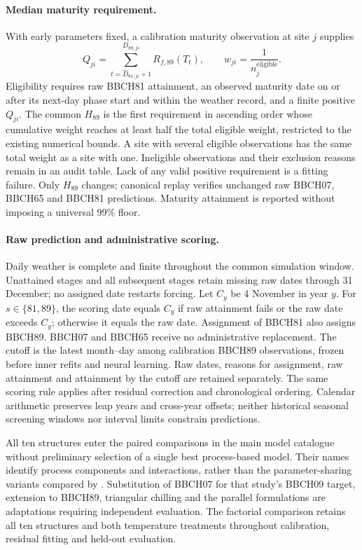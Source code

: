 \documentclass[a4paper,11pt]{article}
\begin{document}
\paragraph{Median maturity requirement.}
With early parameters fixed, a calibration maturity observation at site $j$ supplies
\begin{equation}
Q_{ji}=\sum_{t=\widehat D_{81,ji}+1}^{D_{89,ji}}R_{f,89}(T_t),
\qquad w_{ji}=\frac{1}{n_j^{\mathrm{eligible}}}.
\label{eq:maturity_median_requirement}
\end{equation}
Eligibility requires raw BBCH81 attainment, an observed maturity date on or after its next-day phase start and within the weather record, and a finite positive $Q_{ji}$. The common $H_{89}$ is the first requirement in ascending order whose cumulative weight reaches at least half the total eligible weight, restricted to the existing numerical bounds. A site with several eligible observations has the same total weight as a site with one. Ineligible observations and their exclusion reasons remain in an audit table. Lack of any valid positive requirement is a fitting failure. Only $H_{89}$ changes; canonical replay verifies unchanged raw BBCH07, BBCH65 and BBCH81 predictions. Maturity attainment is reported without imposing a universal 99\% floor.

\paragraph{Raw prediction and administrative scoring.}
Daily weather is complete and finite throughout the common simulation window. Unattained stages and all subsequent stages retain missing raw dates through 31 December; no assigned date restarts forcing. Let $C_y$ be 4 November in year $y$. For $s\in\{81,89\}$, the scoring date equals $C_y$ if raw attainment fails or the raw date exceeds $C_y$; otherwise it equals the raw date. Assignment of BBCH81 also assigns BBCH89. BBCH07 and BBCH65 receive no administrative replacement. The cutoff is the latest month--day among calibration BBCH89 observations, frozen before inner refits and neural learning. Raw dates, reasons for assignment, raw attainment and attainment by the cutoff are retained separately. The same scoring rule applies after residual correction and chronological ordering. Calendar arithmetic preserves leap years and cross-year offsets; neither historical seasonal screening windows nor interval limits constrain predictions.

All ten structures enter the paired comparisons in the main model catalogue without preliminary selection of a single best process-based model. Their names identify process components and interactions, rather than the parameter-sharing variants compared by \citet{filaComparisonDifferentModelling2014}. Substitution of BBCH07 for that study's BBCH09 target, extension to BBCH89, triangular chilling and the parallel formulations are adaptations requiring independent evaluation. The factorial comparison retains all ten structures and both temperature treatments throughout calibration, residual fitting and held-out evaluation.
\end{document}
